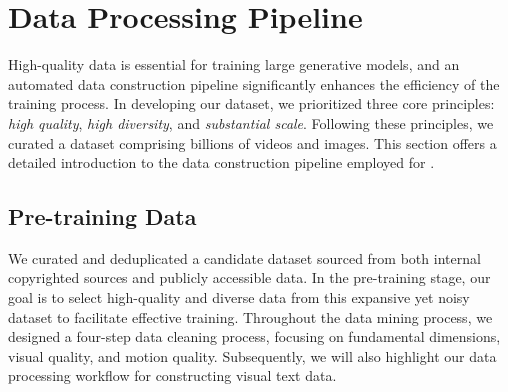 \section{Data Processing Pipeline}
\label{sec:data_processing}

High-quality data is essential for training large generative models, and an automated data construction pipeline significantly enhances the efficiency of the training process.
%
In developing our dataset, we prioritized three core principles: \emph{high quality}, \emph{high diversity}, and \emph{substantial scale}.
%
Following these principles, we curated a dataset comprising billions of videos and images. 
%
This section offers a detailed introduction to the data construction pipeline employed for \method.


\subsection{Pre-training Data}

We curated and deduplicated a candidate dataset sourced from both internal copyrighted sources and publicly accessible data. 
%
In the pre-training stage, our goal is to select high-quality and diverse data from this expansive yet noisy dataset to facilitate effective training.
%
Throughout the data mining process, we designed a four-step data cleaning process, focusing on fundamental dimensions, visual quality, and motion quality. %
Subsequently, we will also highlight our data processing workflow for constructing visual text data.


